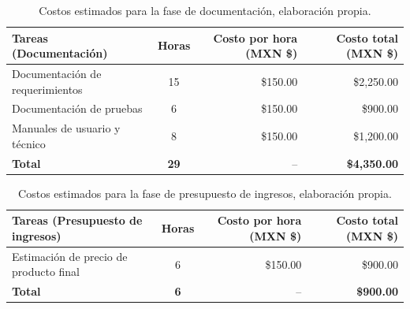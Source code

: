 \begin{table}[H]
	\centering
	\renewcommand{\arraystretch}{1.6}
	\setlength{\tabcolsep}{10pt}
	\Huge
	\begin{adjustbox}{max width=\textwidth}
		\begin{tabular}{|p{9.5cm}|c|r|r|}
			\hline
			\textbf{Tareas (Documentación)} & \textbf{Horas} & \textbf{Costo por hora (MXN \$)} & \textbf{Costo total (MXN \$)} \\ \hline
			Documentación de requerimientos & 15 & \$150.00 & \$2,250.00 \\ \hline
			Documentación de pruebas & 6 & \$150.00 & \$900.00 \\ \hline
			Manuales de usuario y técnico & 8 & \$150.00 & \$1,200.00 \\ \hline
			\textbf{Total} & \textbf{29} & -- & \textbf{\$4,350.00} \\ \hline
		\end{tabular}
	\end{adjustbox}
	\caption[Costos estimados para la fase de documentación]{Costos estimados para la fase de documentación, elaboración propia.} 	
	\label{tab:costos_documentacion_nuevo}
\end{table}

\begin{table}[H]
	\centering
	\renewcommand{\arraystretch}{1.6}
	\setlength{\tabcolsep}{10pt}
	\Huge
	\begin{adjustbox}{max width=\textwidth}
		\begin{tabular}{|p{9.5cm}|c|r|r|}
			\hline
			\textbf{Tareas (Presupuesto de ingresos)} & \textbf{Horas} & \textbf{Costo por hora (MXN \$)} & \textbf{Costo total (MXN \$)} \\ \hline
			Estimación de precio de producto final & 6 & \$150.00 & \$900.00 \\ \hline
			\textbf{Total} & \textbf{6} & -- & \textbf{\$900.00} \\ \hline
		\end{tabular}
	\end{adjustbox}
	\caption[Costos estimados para la fase de presupuesto de ingresos]{Costos estimados para la fase de presupuesto de ingresos, elaboración propia.} 	
	\label{tab:costos_presupuesto_ingresos}
\end{table}

